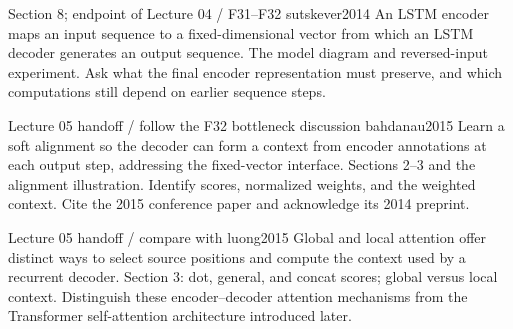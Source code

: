   {Section 8; endpoint of Lecture 04 \quad / \quad F31--F32}
  {sutskever2014}
  {An LSTM encoder maps an input sequence to a fixed-dimensional vector
  from which an LSTM decoder generates an output sequence.}
  {The model diagram and reversed-input experiment. Ask what the final
  encoder representation must preserve, and which computations still depend
  on earlier sequence steps.}

  {Lecture 05 handoff \quad / \quad follow the F32 bottleneck discussion}
  {bahdanau2015}
  {Learn a soft alignment so the decoder can form a context from encoder
  annotations at each output step, addressing the fixed-vector interface.}
  {Sections 2--3 and the alignment illustration. Identify scores, normalized
  weights, and the weighted context. Cite the 2015 conference paper and
  acknowledge its 2014 preprint.}

  {Lecture 05 handoff \quad / \quad compare with }
  {luong2015}
  {Global and local attention offer distinct ways to select source
  positions and compute the context used by a recurrent decoder.}
  {Section 3: dot, general, and concat scores; global versus local context.
  Distinguish these encoder--decoder attention mechanisms from the
  Transformer self-attention architecture introduced later.}
